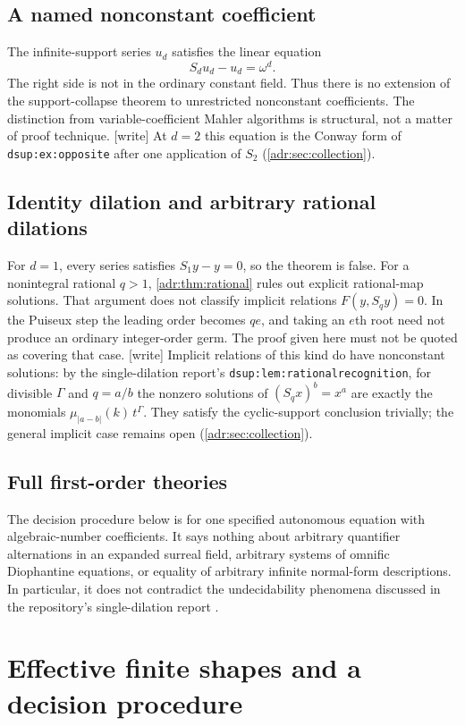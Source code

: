\documentclass[11pt,letterpaper]{article}
\numberwithin{equation}{section}
\theoremstyle{definition}
\theoremstyle{remark}
\newcommand{\abs}[1]{\lvert#1\rvert}
\newcommand{\lbl}[1]{\nolinkurl{#1}}%
\newcommand{\wtag}{\textup{[write]}}%
\begin{document}
\subsection{A named nonconstant coefficient}
The infinite-support series $u_d$ satisfies the linear equation
\[
 S_du_d-u_d=\omega^d.
\]
The right side is not in the ordinary constant field. Thus there is no
extension of the support-collapse theorem to unrestricted nonconstant
coefficients. The distinction from variable-coefficient Mahler algorithms
\cite{FR,CDDM} is structural, not a matter of proof technique.
\wtag{} At $d=2$ this equation is the Conway form of
\lbl{dsup:ex:opposite} after one application of $S_2$
(\cref{adr:sec:collection}).

\subsection{Identity dilation and arbitrary rational dilations}
For $d=1$, every series satisfies $S_1y-y=0$, so the theorem is false.
For a nonintegral rational $q>1$, \cref{adr:thm:rational} rules out explicit
rational-map solutions. That argument does not classify implicit
relations $F(y,S_qy)=0$. In the Puiseux step the leading order becomes
$qe$, and taking an $e$th root need not produce an ordinary integer-order
germ. The proof given here must not be quoted as covering that case.
\wtag{} Implicit relations of this kind do have nonconstant solutions:
by the single-dilation report's \lbl{dsup:lem:rationalrecognition}, for
divisible $\Gamma$ and $q=a/b$ the nonzero solutions of $(S_qx)^b=x^a$
are exactly the monomials $\mu_{\abs{a-b}}(k)\,t^\Gamma$. They satisfy the
cyclic-support conclusion trivially; the general implicit case remains
open (\cref{adr:sec:collection}).

\subsection{Full first-order theories}
The decision procedure below is for one specified autonomous equation
with algebraic-number coefficients. It says nothing about arbitrary
quantifier alternations in an expanded surreal field, arbitrary systems
of omnific Diophantine equations, or equality of arbitrary infinite
normal-form descriptions. In particular, it does not contradict the
undecidability phenomena discussed in the repository's single-dilation
report \cite{RepoDilation}.

\section{Effective finite shapes and a decision procedure}
\label{adr:sec:effective}
\end{document}
